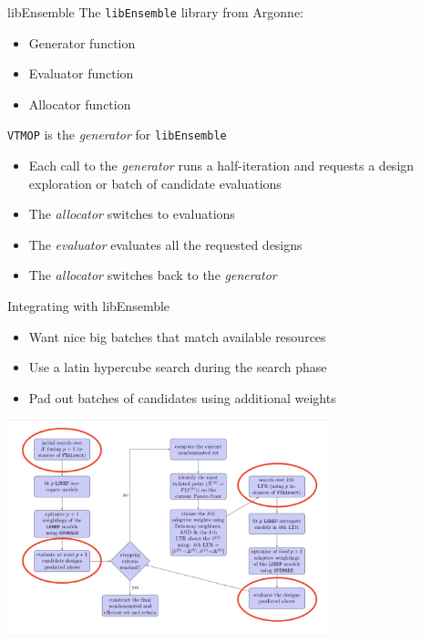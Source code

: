 \documentclass[xcolor=dvipsnames]{beamer}
\begin{document}
\begin{frame}{libEnsemble}
The {\tt libEnsemble} library from Argonne:
\begin{itemize}
\item Generator function
\item Evaluator function
\item Allocator function
\end{itemize}
\bigskip
\pause
\texttt{VTMOP} is the {\it generator} for {\tt libEnsemble}
\begin{itemize}
\item Each call to the {\it generator} runs a half-iteration and requests
a design exploration or batch of candidate evaluations
\item The {\it allocator} switches to evaluations
\item The {\it evaluator} evaluates all the requested designs
\item The {\it allocator} switches back to the {\it generator}
\end{itemize}
\end{frame}
\begin{frame}{Integrating with libEnsemble}
\begin{itemize}
\item Want nice big batches that match available resources
\item Use a latin hypercube search during the search phase
\item Pad out batches of candidates using additional weights
\end{itemize}
\begin{center}
\includegraphics[width=0.7\textwidth]{eval-chart.png}
\end{center}
\end{frame}
\end{document}
